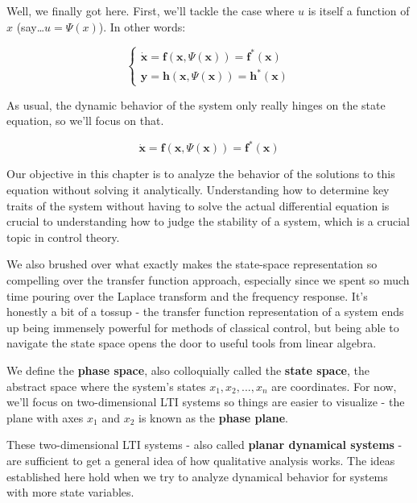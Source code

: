 \documentclass[
  letterpaper,
  DIV=11,
  numbers=noendperiod]{scrreprt}
\begin{document}
Well, we finally got here. First, we'll tackle the case where \(u\) is
itself a function of \(x\) (say\ldots{}\(u = \Psi(x)\)). In other words:

\begin{equation*}
    \begin{cases}
        \boldsymbol{\dot{\boldsymbol{x}}} = \boldsymbol{f}(\boldsymbol{x}, \Psi({\boldsymbol{x}})) = \boldsymbol{f}^*(\boldsymbol{x}) \\
        \boldsymbol{y} = \boldsymbol{h}(\boldsymbol{x}, \Psi({\boldsymbol{x}})) = \boldsymbol{h}^*(\boldsymbol{x})
    \end{cases}
\end{equation*}

As usual, the dynamic behavior of the system only really hinges on the
state equation, so we'll focus on that.

\[\boldsymbol{\dot{\boldsymbol{x}}} = \boldsymbol{f}(\boldsymbol{x}, \Psi({\boldsymbol{x}})) = \boldsymbol{f}^*(\boldsymbol{x})\]

Our objective in this chapter is to analyze the behavior of the
solutions to this equation without solving it analytically.
Understanding how to determine key traits of the system without having
to solve the actual differential equation is crucial to understanding
how to judge the stability of a system, which is a crucial topic in
control theory.

We also brushed over what exactly makes the state-space representation
so compelling over the transfer function approach, especially since we
spent so much time pouring over the Laplace transform and the frequency
response. It's honestly a bit of a tossup - the transfer function
representation of a system ends up being immensely powerful for methods
of classical control, but being able to navigate the state space opens
the door to useful tools from linear algebra.

We define the \textbf{phase space}, also colloquially called the
\textbf{state space}, the abstract space where the system's states
\(x_1, x_2, ..., x_n\) are coordinates. For now, we'll focus on
two-dimensional LTI systems so things are easier to visualize - the
plane with axes \(x_1\) and \(x_2\) is known as the \textbf{phase
plane}.

These two-dimensional LTI systems - also called \textbf{planar dynamical
systems} - are sufficient to get a general idea of how qualitative
analysis works. The ideas established here hold when we try to analyze
dynamical behavior for systems with more state variables.
\end{document}
